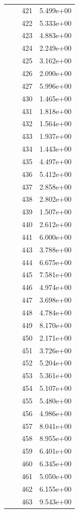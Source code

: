 \documentclass[12pt]{article}
\begin{document}
\begin{longtable}{@{}cccc@{}}
 &  & 421 & 5.499e+00 \\
 &  & 422 & 5.333e+00 \\
 &  & 423 & 4.883e+00 \\
 &  & 424 & 2.249e+00 \\
 &  & 425 & 3.162e+00 \\
 &  & 426 & 2.090e+00 \\
 &  & 427 & 5.996e+00 \\
 &  & 430 & 1.465e+00 \\
 &  & 431 & 1.818e+00 \\
 &  & 432 & 1.564e+00 \\
 &  & 433 & 1.937e+00 \\
 &  & 434 & 1.443e+00 \\
 &  & 435 & 4.497e+00 \\
 &  & 436 & 5.412e+00 \\
 &  & 437 & 2.858e+00 \\
 &  & 438 & 2.802e+00 \\
 &  & 439 & 1.507e+00 \\
 &  & 440 & 2.612e+00 \\
 &  & 441 & 6.000e+00 \\
 &  & 443 & 3.788e+00 \\
 &  & 444 & 6.675e+00 \\
 &  & 445 & 7.581e+00 \\
 &  & 446 & 4.974e+00 \\
 &  & 447 & 3.698e+00 \\
 &  & 448 & 4.784e+00 \\
 &  & 449 & 8.170e+00 \\
 &  & 450 & 2.171e+00 \\
 &  & 451 & 3.726e+00 \\
 &  & 452 & 5.204e+00 \\
 &  & 453 & 5.361e+00 \\
 &  & 454 & 5.107e+00 \\
 &  & 455 & 5.480e+00 \\
 &  & 456 & 4.986e+00 \\
 &  & 457 & 8.041e+00 \\
 &  & 458 & 8.955e+00 \\
 &  & 459 & 6.401e+00 \\
 &  & 460 & 6.345e+00 \\
 &  & 461 & 5.050e+00 \\
 &  & 462 & 6.155e+00 \\
 &  & 463 & 9.543e+00 \\

\end{longtable}
\end{document}
